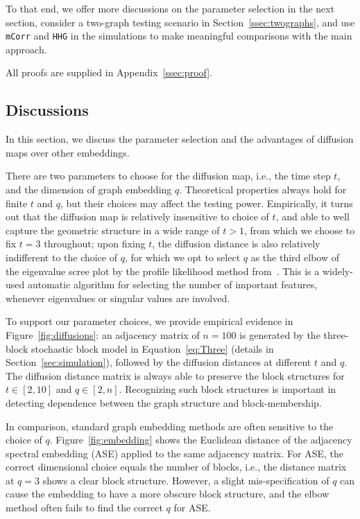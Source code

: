 \documentclass[12pt]{article}
\theoremstyle{definition}
\begin{document}
	To that end, we offer more discussions on the parameter selection in the next section, consider a two-graph testing scenario in Section~\ref{ssec:twographs}, and use \texttt{mCorr} and \texttt{HHG} in the simulations to make meaningful comparisons with the main approach.
	
	All proofs are supplied in Appendix~\ref{ssec:proof}.
	
	\subsection{Discussions}
	\label{ss:dis}
	
	In this section, we discuss the parameter selection and the advantages of diffusion maps over other embeddings. %
	
	There are two parameters to choose for the diffusion map, i.e., the time step $t$, and the dimension of graph embedding $q$. Theoretical properties always hold for finite $t$ and $q$, but their choices may affect the testing power. Empirically, it turns out that the diffusion map is relatively insensitive to choice of $t$, and able to well capture the geometric structure in a wide range of $t>1$, from which we choose to fix $t=3$ throughout; upon fixing $t$, the diffusion distance is also relatively indifferent to the choice of $q$, for which we opt to select $q$ as the third elbow of the eigenvalue scree plot by the profile likelihood method from~\cite{ZhuGhodsi2006}. This is a widely-used automatic algorithm for selecting the number of important features, whenever eigenvalues or singular values are involved. 
	
	To support our parameter choices, we provide empirical evidence in Figure~\ref{fig:diffusions}: an adjacency matrix of $n=100$ is generated by the three-block stochastic block model in Equation~\ref{eq:Three} (details in Section~\ref{sec:simulation}), followed by the diffusion distances at different $t$ and $q$. The diffusion distance matrix is always able to preserve the block structures for $t \in [2,10]$ and $q \in [2,n]$. Recognizing such block structures is important in detecting dependence between the graph structure and block-membership.
	
	In comparison, standard graph embedding methods are often sensitive to the choice of $q$. Figure~\ref{fig:embedding} shows the Euclidean distance of the adjacency spectral embedding (ASE) \citep{SussmanEtAl2012} applied to the same adjacency matrix. For ASE, the correct dimensional choice equals the number of blocks, i.e., the distance matrix at $q=3$ shows a clear block structure. However, a slight mis-specification of $q$ can cause the embedding to have a more obscure block structure, and the elbow method often fails to find the correct $q$ for ASE.
	
\end{document}
